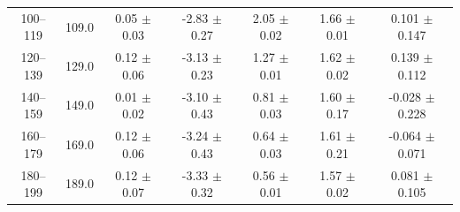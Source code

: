 \begin{table}[htbp]
\begin{tabular}{c c c c c c c}
100--119 & 109.0 & 0.05 $\pm$ 0.03 & -2.83 $\pm$ 0.27 & 2.05 $\pm$ 0.02 & 1.66 $\pm$ 0.01 & 0.101 $\pm$ 0.147 \\
120--139 & 129.0 & 0.12 $\pm$ 0.06 & -3.13 $\pm$ 0.23 & 1.27 $\pm$ 0.01 & 1.62 $\pm$ 0.02 & 0.139 $\pm$ 0.112 \\
140--159 & 149.0 & 0.01 $\pm$ 0.02 & -3.10 $\pm$ 0.43 & 0.81 $\pm$ 0.03 & 1.60 $\pm$ 0.17 & -0.028 $\pm$ 0.228 \\
160--179 & 169.0 & 0.12 $\pm$ 0.06 & -3.24 $\pm$ 0.43 & 0.64 $\pm$ 0.03 & 1.61 $\pm$ 0.21 & -0.064 $\pm$ 0.071 \\
180--199 & 189.0 & 0.12 $\pm$ 0.07 & -3.33 $\pm$ 0.32 & 0.56 $\pm$ 0.01 & 1.57 $\pm$ 0.02 & 0.081 $\pm$ 0.105 \\
\hline\hline
\end{tabular}
\end{table}
